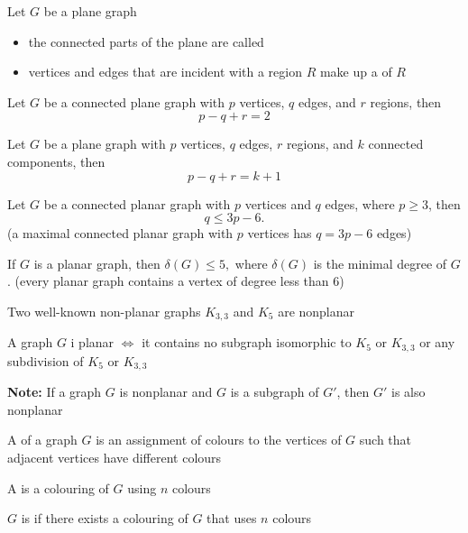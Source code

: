 \documentclass[aspectratio=43]{beamer}
\begin{document}
\begin{frame}
Let $G$ be a plane graph
\begin{itemize}
\item the connected parts of the plane are called 
\item vertices and edges that are incident with a region $R$ make up a  of $R$
\end{itemize}
\vfill
\begin{theorem}
Let $G$ be a connected plane graph with $p$ vertices, $q$ edges, and $r$ regions, then $$p-q+r=2$$
\end{theorem}
\vfill
\begin{corollary}
Let $G$ be a plane graph with $p$ vertices, $q$ edges, $r$ regions, and $k$ connected components, then $$p-q+r=k+1$$
\end{corollary}
\end{frame}


\begin{frame}
\begin{theorem}
Let $G$ be a connected planar graph with $p$ vertices and $q$ edges, where $p\geq 3$, then $$q\leq 3p-6.$$
(a maximal connected planar graph with $p$ vertices has $q=3p-6$ edges)
\end{theorem}
\vfill
\begin{corollary}
If $G$ is a planar graph, then $\delta(G)\leq 5,$
where $\delta(G)$ is the minimal degree of $G$.
(every planar graph contains a vertex of degree less than 6)
\end{corollary}
\end{frame}


\begin{frame}{Two well-known non-planar graphs}
$K_{3,3}$ and $K_5$ are nonplanar
\vfill
\begin{theorem}
A graph $G$ i planar $\iff$ it contains no subgraph isomorphic to $K_5$ or $K_{3,3}$ or any subdivision of $K_5$ or $K_{3,3}$
\end{theorem}
\vfill
\textbf{Note:} If a graph $G$ is nonplanar and $G$ is a subgraph of $G'$, then $G'$ is also nonplanar
\end{frame}


\begin{frame}
\begin{definition}
A  of a graph $G$ is an assignment of colours to the vertices of $G$ such that adjacent vertices have different colours
\end{definition}
\vfill
\begin{definition}[{$n$-colouring of $G$}]
A  is a colouring of $G$ using $n$ colours
\end{definition}
\vfill
\begin{definition}[{$n$-colourable}]
$G$ is  if there exists a colouring of $G$ that uses $n$ colours
\end{definition}
\end{frame}
\end{document}
